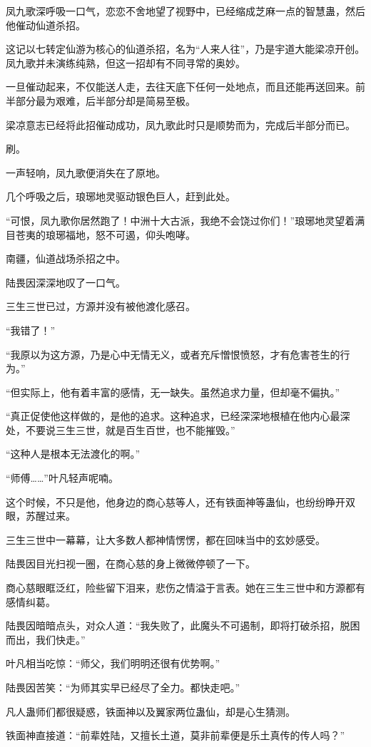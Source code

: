 \begin{this_body}
凤九歌深呼吸一口气，恋恋不舍地望了视野中，已经缩成芝麻一点的智慧蛊，然后他催动仙道杀招。

这记以七转定仙游为核心的仙道杀招，名为“人来人往”，乃是宇道大能梁凉开创。凤九歌并未演练纯熟，但这一招却有不同寻常的奥妙。

一旦催动起来，不仅能送人走，去往天底下任何一处地点，而且还能再送回来。前半部分最为艰难，后半部分却是简易至极。

梁凉意志已经将此招催动成功，凤九歌此时只是顺势而为，完成后半部分而已。

刷。

一声轻响，凤九歌便消失在了原地。

几个呼吸之后，琅琊地灵驱动银色巨人，赶到此处。

“可恨，凤九歌你居然跑了！中洲十大古派，我绝不会饶过你们！”琅琊地灵望着满目苍夷的琅琊福地，怒不可遏，仰头咆哮。

南疆，仙道战场杀招之中。

陆畏因深深地叹了一口气。

三生三世已过，方源并没有被他渡化感召。

“我错了！”

“我原以为这方源，乃是心中无情无义，或者充斥憎恨愤怒，才有危害苍生的行为。”

“但实际上，他有着丰富的感情，无一缺失。虽然追求力量，但却毫不偏执。”

“真正促使他这样做的，是他的追求。这种追求，已经深深地根植在他内心最深处，不要说三生三世，就是百生百世，也不能摧毁。”

“这种人是根本无法渡化的啊。”

“师傅……”叶凡轻声呢喃。

这个时候，不只是他，他身边的商心慈等人，还有铁面神等蛊仙，也纷纷睁开双眼，苏醒过来。

三生三世中一幕幕，让大多数人都神情愣愣，都在回味当中的玄妙感受。

陆畏因目光扫视一圈，在商心慈的身上微微停顿了一下。

商心慈眼眶泛红，险些留下泪来，悲伤之情溢于言表。她在三生三世中和方源都有感情纠葛。

陆畏因暗暗点头，对众人道：“我失败了，此魔头不可遏制，即将打破杀招，脱困而出，我们快走。”

叶凡相当吃惊：“师父，我们明明还很有优势啊。”

陆畏因苦笑：“为师其实早已经尽了全力。都快走吧。”

凡人蛊师们都很疑惑，铁面神以及翼家两位蛊仙，却是心生猜测。

铁面神直接道：“前辈姓陆，又擅长土道，莫非前辈便是乐土真传的传人吗？”


\end{this_body}
